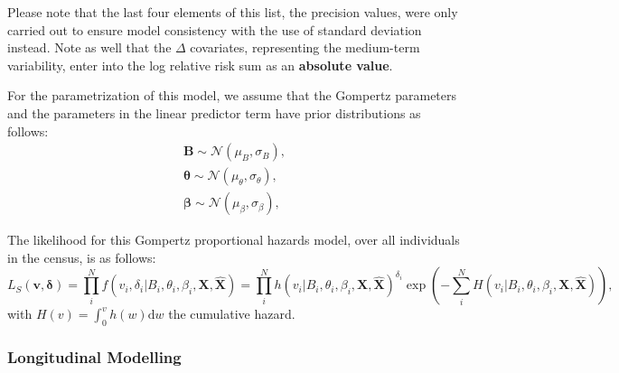 \documentclass[
]{article}
\begin{document}
Please note that the last four elements of this list, the precision values, were only carried out to ensure model consistency with the use of standard deviation instead.
Note as well that the \(\Delta\) covariates, representing the medium-term variability, enter into the log relative risk sum as an \textbf{absolute value}.

For the parametrization of this model, we assume that the Gompertz parameters and the parameters in the linear predictor term have prior distributions as follows:
\begin{equation}\label{priorsS}
\begin{aligned}
  \boldsymbol{B}\sim\mathcal{N}(\mu_B,\sigma_B),\\
  \boldsymbol{\theta}\sim\mathcal{N}(\mu_\theta,\sigma_\theta),\\
  \boldsymbol{\beta}\sim \mathcal{N}(\mu_\beta,\sigma_\beta),
\end{aligned}
\end{equation}

The likelihood for this Gompertz proportional hazards model, over all individuals in the census, is as follows:
\begin{equation}\label{likesurv}
L_S(\boldsymbol{v},\boldsymbol{\delta})=\prod_i^N f(v_i,\delta_i|B_i,\theta_i,\beta_i,\boldsymbol{X},\hat{\boldsymbol{X}})=\prod_i^N h(v_i|B_i,\theta_i,\beta_i,\boldsymbol{X},\hat{\boldsymbol{X}})^{\delta_i} \exp{\left( -\sum_i^N H(v_i|B_i,\theta_i,\beta_i,\boldsymbol{X},\hat{\boldsymbol{X}}) \right)},
\end{equation}
with \(H(v)=\int_0^v h(w) \mathrm{d}w\) the cumulative hazard.

\subsubsection{Longitudinal Modelling}\label{longitudinal-modelling}
\end{document}
